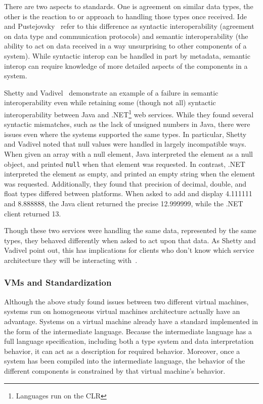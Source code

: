 \documentclass{sig-alternate}
\begin{document}
There are two aspects to standards. One is agreement on similar data types, the other is the reaction to or approach to handling those types once received. Ide and Pustejovsky~\cite{Ide:2010} refer to this difference as syntactic interoperability (agreement on data type and communication protocols) and semantic interoperability (the ability to act on data received in a way unsurprising to other components of a system). While syntactic interop can be handled in part by metadata, semantic interop can require knowledge of more detailed aspects of the components in a system.

Shetty and Vadivel~\cite{Shetty:2009} demonstrate an example of a failure in semantic interoperability even while retaining some (though not all) syntactic interoperability between Java and .NET\footnote{Languages run on the CLR} web services.
While they found several syntactic mismatches, such as the lack of unsigned numbers in Java, there were issues even where the systems supported the same types. In particular, Shetty and Vadivel noted that null values were handled in largely incompatible ways. When given an array with a null element, Java interpreted the element as a null object, and printed {\tt null} when that element was requested. In contrast, .NET interpreted the element as empty, and printed an empty string when the element was requested. 
Additionally, they found that precision of decimal, double, and float types differed between platforms. When asked to add and display 4.111111 and 8.888888, the Java client returned the precise 12.999999, while the .NET client returned 13.

Though these two services were handling the same data, represented by the same types, they behaved differently \linebreak
 when asked to act upon that data. As Shetty and Vadivel point out, this has implications for clients who don't know which service architecture they will be interacting with~\cite{Shetty:2009}.


\subsubsection*{VMs and Standardization}
Although the above study found issues between two different virtual machines, systems run on homogeneous virtual machines architecture actually have an advantage. Systems on a virtual machine already have a standard implemented in the form of the intermediate language. Because the intermediate language has a full language specification, including both a type system and data interpretation behavior, it can act as a description for required behavior. Moreover, once a system has been compiled into the intermediate language, the behavior of the different components is constrained by that virtual machine's behavior.
\end{document}
